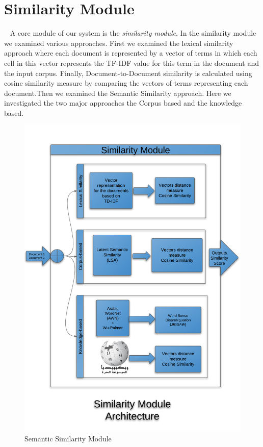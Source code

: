 \section{Similarity Module}~\label{sec:similarity}
A core module of our system is the \textit{similarity module}. In the similarity module we examined various approaches. First we examined the lexical similarity approach where each document is represented by a vector of terms in which each cell in this vector represents the TF-IDF value for this term in the document and the input corpus. 
Finally, Document-to-Document similarity is calculated using cosine similarity measure by comparing the vectors of terms representing each document.Then we examined the Semantic Similarity approach. Here we investigated the two major approaches the Corpus based and the knowledge based.
\begin{figure}[htb]
\begin{center}
\includegraphics[totalheight=.75\textheight,
width=.75\textwidth]{./Figures/Semantic module.png}
\end{center}
\caption{Semantic Similarity Module}
\label{fig:semanticModule}
\end{figure}

